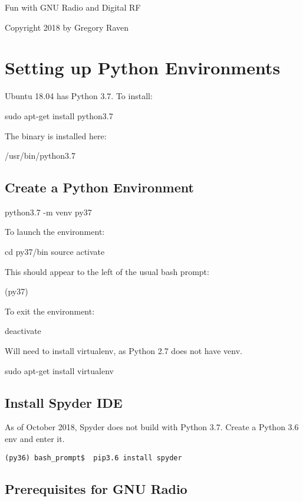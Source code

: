 \documentclass[oneside,letterpaper,12pt]{book}
\title{}
\author{}
\begin{document}
	


\frontmatter
Fun with GNU Radio and Digital RF

Copyright 2018 by Gregory Raven
\tableofcontents
\listoftables
\listoffigures
	

\mainmatter

\chapter{Setting up Python Environments}

Ubuntu 18.04 has Python 3.7.  To install:

sudo apt-get install python3.7

The binary is installed here:

/usr/bin/python3.7

\section{Create a Python Environment}

python3.7 -m venv py37

To launch the environment:

cd py37/bin
source activate

This should appear to the left of the usual bash prompt:

(py37)

To exit the environment:

deactivate

Will need to install virtualenv, as Python 2.7 does not have venv.

sudo apt-get install virtualenv

\section{Install Spyder IDE}

As of October 2018, Spyder does not build with Python 3.7.
Create a Python 3.6 env and enter it.

\begin{verbatim}
(py36) bash_prompt$  pip3.6 install spyder
\end{verbatim}

\section{Prerequisites for GNU Radio}
\end{document}
